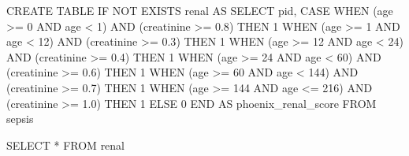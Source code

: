 \documentclass[
  letterpaper,
  DIV=11,
  numbers=noendperiod]{scrartcl}
\newenvironment{Shaded}{\begin{snugshade}}{\end{snugshade}}
\newcommand{\ControlFlowTok}[1]{\textcolor[rgb]{0.00,0.23,0.31}{#1}}
\newcommand{\DecValTok}[1]{\textcolor[rgb]{0.68,0.00,0.00}{#1}}
\newcommand{\FloatTok}[1]{\textcolor[rgb]{0.68,0.00,0.00}{#1}}
\newcommand{\KeywordTok}[1]{\textcolor[rgb]{0.00,0.23,0.31}{#1}}
\newcommand{\NormalTok}[1]{\textcolor[rgb]{0.00,0.23,0.31}{#1}}
\newcommand{\OperatorTok}[1]{\textcolor[rgb]{0.37,0.37,0.37}{#1}}
\begin{document}
\begin{Shaded}
\begin{Highlighting}[]
\KeywordTok{CREATE} \KeywordTok{TABLE} \ControlFlowTok{IF} \KeywordTok{NOT} \KeywordTok{EXISTS}\NormalTok{ renal }\KeywordTok{AS}
\KeywordTok{SELECT}
\NormalTok{  pid,}
  \ControlFlowTok{CASE} \ControlFlowTok{WHEN}\NormalTok{ (age }\OperatorTok{\textgreater{}=}   \DecValTok{0} \KeywordTok{AND}\NormalTok{ age }\OperatorTok{\textless{}}    \DecValTok{1}\NormalTok{) }\KeywordTok{AND}\NormalTok{ (creatinine }\OperatorTok{\textgreater{}=} \FloatTok{0.8}\NormalTok{) }\ControlFlowTok{THEN} \DecValTok{1}
       \ControlFlowTok{WHEN}\NormalTok{ (age }\OperatorTok{\textgreater{}=}   \DecValTok{1} \KeywordTok{AND}\NormalTok{ age }\OperatorTok{\textless{}}   \DecValTok{12}\NormalTok{) }\KeywordTok{AND}\NormalTok{ (creatinine }\OperatorTok{\textgreater{}=} \FloatTok{0.3}\NormalTok{) }\ControlFlowTok{THEN} \DecValTok{1}
       \ControlFlowTok{WHEN}\NormalTok{ (age }\OperatorTok{\textgreater{}=}  \DecValTok{12} \KeywordTok{AND}\NormalTok{ age }\OperatorTok{\textless{}}   \DecValTok{24}\NormalTok{) }\KeywordTok{AND}\NormalTok{ (creatinine }\OperatorTok{\textgreater{}=} \FloatTok{0.4}\NormalTok{) }\ControlFlowTok{THEN} \DecValTok{1}
       \ControlFlowTok{WHEN}\NormalTok{ (age }\OperatorTok{\textgreater{}=}  \DecValTok{24} \KeywordTok{AND}\NormalTok{ age }\OperatorTok{\textless{}}   \DecValTok{60}\NormalTok{) }\KeywordTok{AND}\NormalTok{ (creatinine }\OperatorTok{\textgreater{}=} \FloatTok{0.6}\NormalTok{) }\ControlFlowTok{THEN} \DecValTok{1}
       \ControlFlowTok{WHEN}\NormalTok{ (age }\OperatorTok{\textgreater{}=}  \DecValTok{60} \KeywordTok{AND}\NormalTok{ age }\OperatorTok{\textless{}}  \DecValTok{144}\NormalTok{) }\KeywordTok{AND}\NormalTok{ (creatinine }\OperatorTok{\textgreater{}=} \FloatTok{0.7}\NormalTok{) }\ControlFlowTok{THEN} \DecValTok{1}
       \ControlFlowTok{WHEN}\NormalTok{ (age }\OperatorTok{\textgreater{}=} \DecValTok{144} \KeywordTok{AND}\NormalTok{ age }\OperatorTok{\textless{}=} \DecValTok{216}\NormalTok{) }\KeywordTok{AND}\NormalTok{ (creatinine }\OperatorTok{\textgreater{}=} \FloatTok{1.0}\NormalTok{) }\ControlFlowTok{THEN} \DecValTok{1}
       \ControlFlowTok{ELSE} \DecValTok{0} \ControlFlowTok{END} \KeywordTok{AS}\NormalTok{ phoenix\_renal\_score}
\KeywordTok{FROM}\NormalTok{ sepsis}
\end{Highlighting}
\end{Shaded}

\begin{Shaded}
\begin{Highlighting}[]
\KeywordTok{SELECT} \OperatorTok{*} \KeywordTok{FROM}\NormalTok{ renal}
\end{Highlighting}
\end{Shaded}
\end{document}
